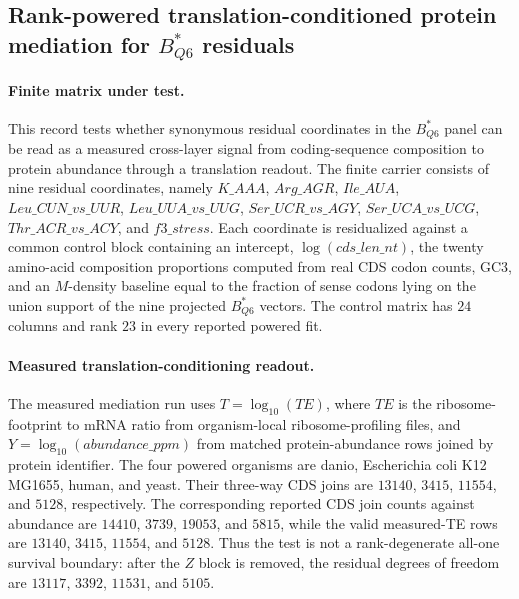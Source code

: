 \subsection{Rank-powered translation-conditioned protein mediation for $B^{\ast}_{Q6}$ residuals}\label{subsec:q6-rank-powered-translation-conditioned-protein-mediation-cross-layer}

\paragraph{Finite matrix under test.}
This record tests whether synonymous residual coordinates in the $B^{\ast}_{Q6}$ panel can be read as a measured cross-layer signal from coding-sequence composition to protein abundance through a translation readout.  The finite carrier consists of nine residual coordinates, namely $K\_AAA$, $Arg\_AGR$, $Ile\_AUA$, $Leu\_CUN\_vs\_UUR$, $Leu\_UUA\_vs\_UUG$, $Ser\_UCR\_vs\_AGY$, $Ser\_UCA\_vs\_UCG$, $Thr\_ACR\_vs\_ACY$, and $f3\_stress$.  Each coordinate is residualized against a common control block containing an intercept, $\log(cds\_len\_nt)$, the twenty amino-acid composition proportions computed from real CDS codon counts, GC3, and an $M$-density baseline equal to the fraction of sense codons lying on the union support of the nine projected $B^{\ast}_{Q6}$ vectors.  The control matrix has $24$ columns and rank $23$ in every reported powered fit.

\paragraph{Measured translation-conditioning readout.}
The measured mediation run uses $T=\log_{10}(TE)$, where $TE$ is the ribosome-footprint to mRNA ratio from organism-local ribosome-profiling files, and $Y=\log_{10}(abundance\_ppm)$ from matched protein-abundance rows joined by protein identifier.  The four powered organisms are danio, Escherichia coli K12 MG1655, human, and yeast.  Their three-way CDS joins are $13140$, $3415$, $11554$, and $5128$, respectively.  The corresponding reported CDS join counts against abundance are $14410$, $3739$, $19053$, and $5815$, while the valid measured-TE rows are $13140$, $3415$, $11554$, and $5128$.  Thus the test is not a rank-degenerate all-one survival boundary: after the $Z$ block is removed, the residual degrees of freedom are $13117$, $3392$, $11531$, and $5105$.

